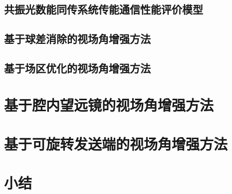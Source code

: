 \subsection{共振光数能同传系统传能通信性能评价模型}

\subsection{基于球差消除的视场角增强方法}

\subsection{基于场区优化的视场角增强方法}


\section{基于腔内望远镜的视场角增强方法}

\section{基于可旋转发送端的视场角增强方法}

\section{小结}